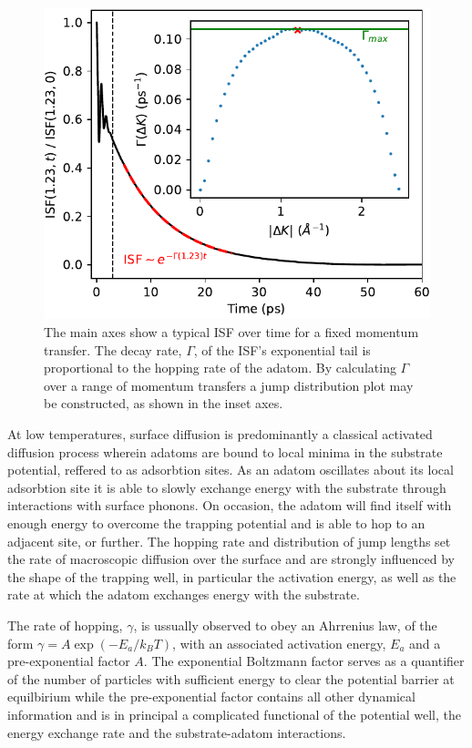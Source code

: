 \documentclass[7pt]{article}
\begin{document}
\begin{figure}
	\centering
	\includegraphics[width=1.0\columnwidth]{isf_dk}
	\caption{The main axes show a typical ISF over time for a fixed momentum transfer. The decay rate, $\Gamma$, of the ISF's exponential tail is proportional to the hopping rate of the adatom. By calculating $\Gamma$ over a range of momentum transfers a jump distribution plot may be constructed, as shown in the inset axes.} 
	\label{fig:isf_dk}
\end{figure}

At low temperatures, surface diffusion is predominantly a classical activated diffusion process\cite{} wherein adatoms are bound to local minima in the substrate potential, reffered to as adsorbtion sites. As an adatom oscillates about its local adsorbtion site it is able to slowly exchange energy with the substrate through interactions with surface phonons. On occasion, the adatom will find itself with enough energy to overcome the trapping potential and is able to hop to an adjacent site, or further. The hopping rate and distribution of jump lengths set the rate of macroscopic diffusion over the surface and are strongly influenced by the shape of the trapping well, in particular the activation energy, as well as the rate at which the adatom exchanges energy with the substrate.

The rate of hopping, $\gamma$, is ussually observed to obey an Ahrrenius law, of the form $\gamma = A\exp\left(-E_a/k_BT\right)$, with an associated activation energy, $E_a$ and a pre-exponential factor $A$. The exponential Boltzmann factor serves as a quantifier of the number of particles with sufficient energy to clear the potential barrier at equilbirium while the pre-exponential factor contains all other dynamical information and is in principal a complicated functional of the potential well, the energy exchange rate and the substrate-adatom interactions. 
\end{document}
